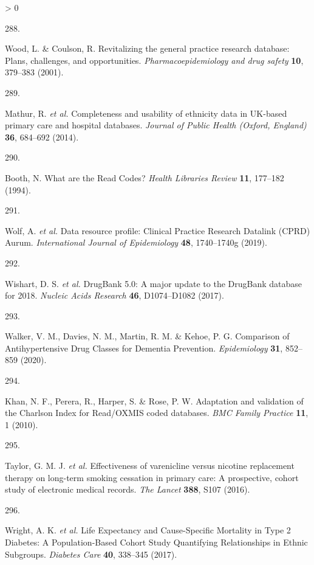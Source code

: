 \documentclass[a4paper, twoside]{templates/ociamthesis}
\newlength{\cslhangindent}
\newlength{\csllabelwidth}
\newenvironment{CSLReferences}[3] %
 {%
  \setlength{\parindent}{0pt}
  \ifodd #1 \everypar{\setlength{\hangindent}{\cslhangindent}}\ignorespaces\fi
  \ifnum #2 > 0
  \setlength{\parskip}{#2\baselineskip}
  \fi
 }%
 {}
\newcommand{\CSLLeftMargin}[1]{\parbox[t]{\maxof{\widthof{#1}}{\csllabelwidth}}{#1}}
\newcommand{\CSLRightInline}[1]{\parbox[t]{\linewidth - \csllabelwidth}{#1}}
\begin{document}
\begin{CSLReferences}{0}{0}
\leavevmode\hypertarget{ref-wood2001revitalizing}{}%
\CSLLeftMargin{288. }
\CSLRightInline{Wood, L. \& Coulson, R. Revitalizing the general practice research database: Plans, challenges, and opportunities. \emph{Pharmacoepidemiology and drug safety} \textbf{10}, 379--383 (2001).}

\leavevmode\hypertarget{ref-mathur2014}{}%
\CSLLeftMargin{289. }
\CSLRightInline{Mathur, R. \emph{et al.} Completeness and usability of ethnicity data in {UK}-based primary care and hospital databases. \emph{Journal of Public Health (Oxford, England)} \textbf{36}, 684--692 (2014).}

\leavevmode\hypertarget{ref-booth1994}{}%
\CSLLeftMargin{290. }
\CSLRightInline{Booth, N. What are the {Read Codes}? \emph{Health Libraries Review} \textbf{11}, 177--182 (1994).}

\leavevmode\hypertarget{ref-wolf2019}{}%
\CSLLeftMargin{291. }
\CSLRightInline{Wolf, A. \emph{et al.} Data resource profile: Clinical {Practice Research Datalink} ({CPRD}) {Aurum}. \emph{International Journal of Epidemiology} \textbf{48}, 1740--1740g (2019).}

\leavevmode\hypertarget{ref-wishart2017}{}%
\CSLLeftMargin{292. }
\CSLRightInline{Wishart, D. S. \emph{et al.} {DrugBank} 5.0: A major update to the {DrugBank} database for 2018. \emph{Nucleic Acids Research} \textbf{46}, D1074--D1082 (2017).}

\leavevmode\hypertarget{ref-walker2020}{}%
\CSLLeftMargin{293. }
\CSLRightInline{Walker, V. M., Davies, N. M., Martin, R. M. \& Kehoe, P. G. Comparison of {Antihypertensive Drug Classes} for {Dementia Prevention}. \emph{Epidemiology} \textbf{31}, 852--859 (2020).}

\leavevmode\hypertarget{ref-khan2010}{}%
\CSLLeftMargin{294. }
\CSLRightInline{Khan, N. F., Perera, R., Harper, S. \& Rose, P. W. Adaptation and validation of the {Charlson Index} for {Read}/{OXMIS} coded databases. \emph{BMC Family Practice} \textbf{11}, 1 (2010).}

\leavevmode\hypertarget{ref-taylor2016}{}%
\CSLLeftMargin{295. }
\CSLRightInline{Taylor, G. M. J. \emph{et al.} Effectiveness of varenicline versus nicotine replacement therapy on long-term smoking cessation in primary care: A prospective, cohort study of electronic medical records. \emph{The Lancet} \textbf{388}, S107 (2016).}

\leavevmode\hypertarget{ref-wright2017}{}%
\CSLLeftMargin{296. }
\CSLRightInline{Wright, A. K. \emph{et al.} Life {Expectancy} and {Cause}-{Specific Mortality} in {Type} 2 {Diabetes}: A {Population}-{Based Cohort Study Quantifying Relationships} in {Ethnic Subgroups}. \emph{Diabetes Care} \textbf{40}, 338--345 (2017).}


\end{CSLReferences}
\end{document}
